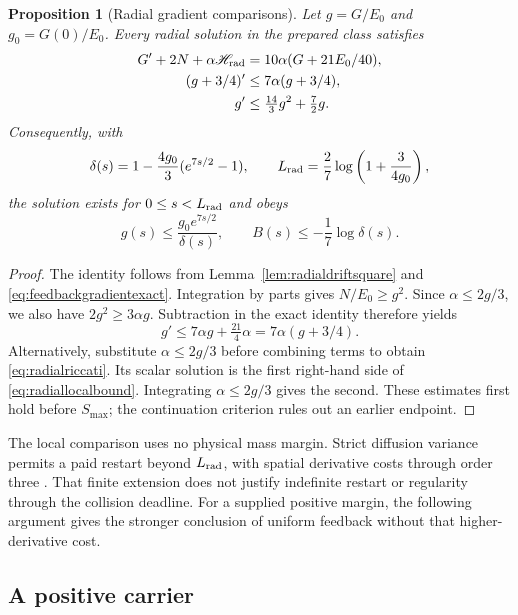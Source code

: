 \documentclass[11pt]{article}
\numberwithin{equation}{section}
\newtheorem{proposition}[theorem]{Proposition}
\begin{document}
\begin{proposition}[Radial gradient comparisons]\label{prop:radialgradient}
Let $g=G/E_0$ and $g_0=G(0)/E_0$. Every radial solution in the
prepared class satisfies
\begin{align}
 G'+2N+\alpha\mathscr H_{\rm rad}
   &=10\alpha(G+21E_0/40),\label{eq:radialgradientidentity}\\
 (g+3/4)'&\le7\alpha(g+3/4),\label{eq:retaineddiffusion}\\
 g'&\le\tfrac{14}{3}g^2+\tfrac72g.\label{eq:radialriccati}
\end{align}
Consequently, with
\begin{equation}\label{eq:radiallocalconstants}
 \delta(s)=1-\frac{4g_0}{3}(e^{7s/2}-1),\qquad
 L_{\rm rad}=\frac27\log\left(1+\frac{3}{4g_0}\right),
\end{equation}
the solution exists for $0\le s<L_{\rm rad}$ and obeys
\begin{equation}\label{eq:radiallocalbound}
 g(s)\le\frac{g_0e^{7s/2}}{\delta(s)},\qquad
 B(s)\le-\frac17\log\delta(s).
\end{equation}
\end{proposition}
\begin{proof}
The identity follows from Lemma~\ref{lem:radialdriftsquare} and
\eqref{eq:feedbackgradientexact}. Integration by parts gives
$N/E_0\ge g^2$. Since $\alpha\le2g/3$, we also have
$2g^2\ge3\alpha g$. Subtraction in the exact identity therefore yields
\[
 g'\le7\alpha g+\tfrac{21}{4}\alpha
       =7\alpha(g+3/4).
\]
Alternatively, substitute $\alpha\le2g/3$ before combining terms to
obtain \eqref{eq:radialriccati}. Its scalar solution is the first
right-hand side of \eqref{eq:radiallocalbound}. Integrating
$\alpha\le2g/3$ gives the second. These estimates first hold before
$S_{\max}$; the continuation criterion rules out an earlier endpoint.
\end{proof}

The local comparison uses no physical mass margin. Strict diffusion
variance permits a paid restart beyond $L_{\rm rad}$, with spatial
derivative costs through order three \cite{DiffusionVarianceNote}.
That finite extension does not justify indefinite restart or
regularity through the collision deadline. For a supplied positive
margin, the following argument gives the stronger conclusion of
uniform feedback without that higher-derivative cost.


\subsection{A positive carrier}\label{sec:carrier}
\end{document}
